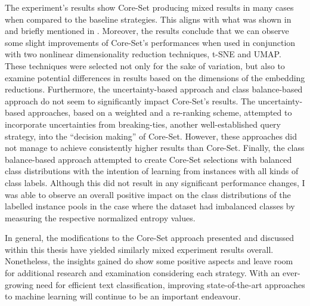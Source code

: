 \documentclass[english,bachelor,ul]{webisthesis} %
\begin{document}
The experiment's results show Core-Set producing mixed results in many cases when compared to the baseline strategies. This aligns with what was shown in \cite{DBLP:conf/kdd/0002MM21} and briefly mentioned in \cite{DBLP:conf/aaai/ColemanCKCBBNSZ22}. Moreover, the results conclude that we can observe some slight improvements of Core-Set's performances when used in conjunction with two nonlinear dimensionality reduction techniques, t-SNE and UMAP. These techniques were selected not only for the sake of variation, but also to examine potential differences in results based on the dimensions of the embedding reductions. Furthermore, the uncertainty-based approach and class balance-based approach do not seem to significantly impact Core-Set's results. The uncertainty-based approaches, based on a weighted and a re-ranking scheme, attempted to incorporate uncertainties from breaking-ties, another well-established query strategy, into the ``decision making'' of Core-Set. However, these approaches did not manage to achieve consistently higher results than Core-Set. Finally, the class balance-based approach attempted to create Core-Set selections with balanced class distributions with the intention of learning from instances with all kinds of class labels. Although this did not result in any significant performance changes, I was able to observe an overall positive impact on the class distributions of the labelled instance pools in the case where the dataset had imbalanced classes by measuring the respective normalized entropy values.

In general, the modifications to the Core-Set approach presented and discussed within this thesis have yielded similarly mixed experiment results overall. Nonetheless, the insights gained do show some positive aspects and leave room for additional research and examination considering each strategy. With an ever-growing need for efficient text classification, improving state-of-the-art approaches to machine learning will continue to be an important endeavour.




\end{document}
